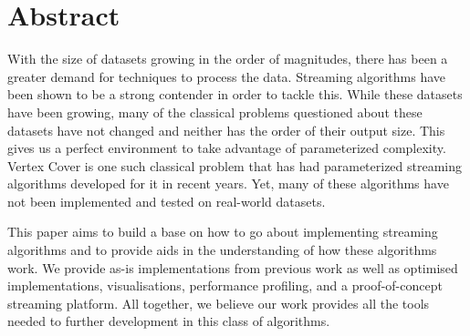 \section*{Abstract}

With the size of datasets growing in the order of magnitudes, there has
been a greater demand for techniques to process the data. Streaming
algorithms have been shown to be a strong contender in order to tackle
this. While these datasets have been growing, many of the classical
problems questioned about these datasets have not changed and neither
has the order of their output size. This gives us a perfect environment
to take advantage of parameterized complexity. Vertex Cover is one such
classical problem that has had parameterized streaming algorithms
developed for it in recent years. Yet, many of these algorithms have not
been implemented and tested on real-world datasets.

This paper aims to build a base on how to go about implementing
streaming algorithms and to provide aids in the understanding of how
these algorithms work. We provide as-is implementations from previous
work as well as optimised implementations, visualisations, performance
profiling, and a proof-of-concept streaming platform. All together, we
believe our work provides all the tools needed to further development in
this class of algorithms.

\pagebreak
